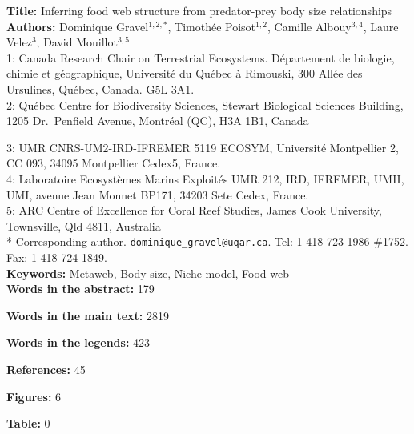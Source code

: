 \documentclass[12pt]{article}
\begin{document}
\linenumbers 
\modulolinenumbers[1]

\textbf{Title:}   Inferring food web structure from predator-prey body size relationships\\

\textbf{Authors:}  Dominique Gravel$^{1,2,*}$, Timoth\'ee Poisot$^{1,2}$, Camille Albouy$^{3,4}$, Laure Velez$^{3}$, David Mouillot$^{3,5}$\\

1: Canada Research Chair on Terrestrial Ecosystems. D\'epartement de biologie, chimie et g\'eographique, Universit\'e du Qu\'ebec \`a Rimouski, 300 All\'ee des Ursulines, Qu\'ebec, Canada. G5L 3A1.\\

2: Qu\'ebec Centre for Biodiversity Sciences, Stewart Biological Sciences Building, 1205 Dr.~Penfield Avenue, Montr\'eal (QC), H3A 1B1, Canada

3: UMR CNRS-UM2-IRD-IFREMER 5119 ECOSYM, Universit\'e Montpellier 2, CC 093, 34095 Montpellier Cedex5, France.\\

4: Laboratoire Ecosystèmes Marins Exploit\'es UMR 212, IRD, IFREMER, UMII, UMI, avenue Jean Monnet BP171, 34203 Sete Cedex, France.\\

5: ARC Centre of Excellence for Coral Reef Studies, James Cook University, Townsville, Qld 4811, Australia\\

* Corresponding author. {\tt dominique\_gravel@uqar.ca}. Tel: 1-418-723-1986 \#1752. Fax: 1-418-724-1849.\\

\textbf{Keywords:} Metaweb, Body size, Niche model, Food web\\

\textbf{Words in the abstract:}      179

\textbf{Words in the main text:}     2819

\textbf{Words in the legends:}       423

\textbf{References:}                   45

\textbf{Figures:}                       6

\textbf{Table:}                         0

\newpage
\doublespacing
\end{document}

